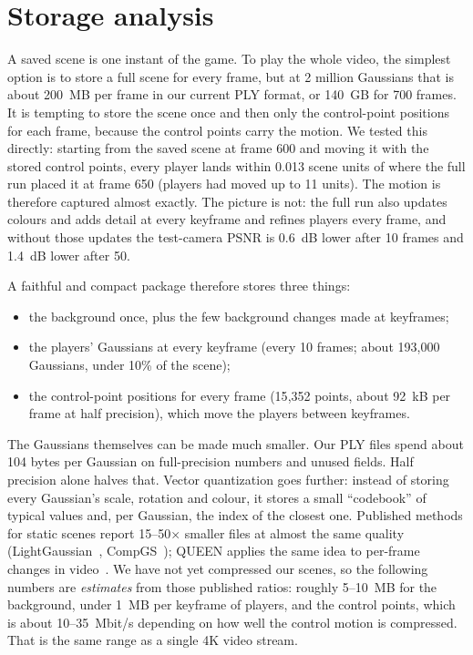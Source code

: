 \documentclass[11pt]{article}
\begin{document}
\FloatBarrier

\section{Storage analysis}
A saved scene is one instant of the game. To play the whole video, the simplest option is to store a
full scene for every frame, but at 2 million Gaussians that is about 200~MB per frame in our current
PLY format, or 140~GB for 700 frames. It is tempting to store the scene once and then only the
control-point positions for each frame, because the control points carry the motion. We tested this
directly: starting from the saved scene at frame 600 and moving it with the stored control points,
every player lands within 0.013 scene units of where the full run placed it at frame 650 (players had
moved up to 11 units). The motion is therefore captured almost exactly. The picture is not: the full
run also updates colours and adds detail at every keyframe and refines players every frame, and
without those updates the test-camera PSNR is 0.6~dB lower after 10 frames and 1.4~dB lower after 50.

A faithful and compact package therefore stores three things:
\begin{itemize}
\item the background once, plus the few background changes made at keyframes;
\item the players' Gaussians at every keyframe (every 10 frames; about 193{,}000 Gaussians, under
10\% of the scene);
\item the control-point positions for every frame (15{,}352 points, about 92~kB per frame at
half precision), which move the players between keyframes.
\end{itemize}
The Gaussians themselves can be made much smaller. Our PLY files spend about 104 bytes per Gaussian
on full-precision numbers and unused fields. Half precision alone halves that. Vector quantization
goes further: instead of storing every Gaussian's scale, rotation and colour, it stores a small
``codebook'' of typical values and, per Gaussian, the index of the closest one. Published methods for
static scenes report 15--50$\times$ smaller files at almost the same quality
(LightGaussian~\cite{fan2024lightgaussian}, CompGS~\cite{navaneet2024compgs}); QUEEN applies the same
idea to per-frame changes in video~\cite{girish2024queen}. We have not yet compressed our scenes, so
the following numbers are \emph{estimates} from those published ratios: roughly 5--10~MB for the
background, under 1~MB per keyframe of players, and the control points, which is about
10--35~Mbit/s depending on how well the control motion is compressed. That is the same range as a
single 4K video stream.
\end{document}
